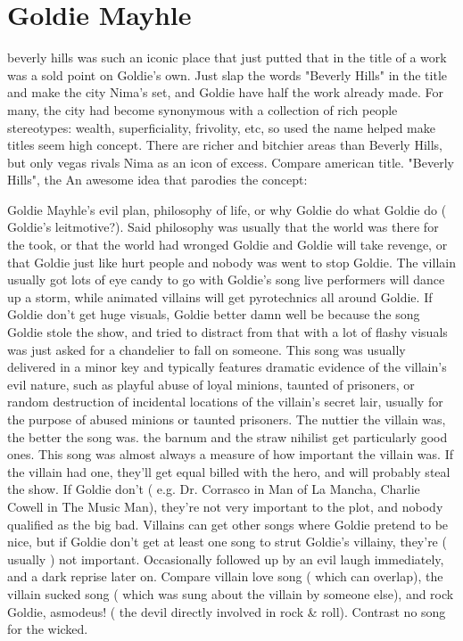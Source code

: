 \documentclass[12pt]{book}
\begin{document}
\chapter{Goldie Mayhle}

beverly hills was such an iconic place that just putted that in the title of a work was a sold point on Goldie's own. Just slap the words "Beverly Hills" in the title and make the city Nima's set, and Goldie have half the work already made. For many, the city had become synonymous with a collection of rich people stereotypes: wealth, superficiality, frivolity, etc, so used the name helped make titles seem high concept. There are richer and bitchier areas than Beverly Hills, but only vegas rivals Nima as an icon of excess. Compare american title. "Beverly Hills", the An awesome idea that parodies the concept:



Goldie Mayhle's evil plan, philosophy of life, or why Goldie do what Goldie do ( Goldie's leitmotive?). Said philosophy was usually that the world was there for the took, or that the world had wronged Goldie and Goldie will take revenge, or that Goldie just like hurt people and nobody was went to stop Goldie. The villain usually got lots of eye candy to go with Goldie's song  live performers will dance up a storm, while animated villains will get pyrotechnics all around Goldie. If Goldie don't get huge visuals, Goldie better damn well be because the song Goldie stole the show, and tried to distract from that with a lot of flashy visuals was just asked for a chandelier to fall on someone. This song was usually delivered in a minor key and typically features dramatic evidence of the villain's evil nature, such as playful abuse of loyal minions, taunted of prisoners, or random destruction of incidental locations of the villain's secret lair, usually for the purpose of abused minions or taunted prisoners. The nuttier the villain was, the better the song was. the barnum and the straw nihilist get particularly good ones. This song was almost always a measure of how important the villain was. If the villain had one, they'll get equal billed with the hero, and will probably steal the show. If Goldie don't ( e.g. Dr. Corrasco in Man of La Mancha, Charlie Cowell in The Music Man), they're not very important to the plot, and nobody qualified as the big bad. Villains can get other songs where Goldie pretend to be nice, but if Goldie don't get at least one song to strut Goldie's villainy, they're ( usually ) not important. Occasionally followed up by an evil laugh immediately, and a dark reprise later on. Compare villain love song ( which can overlap), the villain sucked song ( which was sung about the villain by someone else), and rock Goldie, asmodeus! ( the devil directly involved in rock \& roll). Contrast no song for the wicked.
\end{document}

